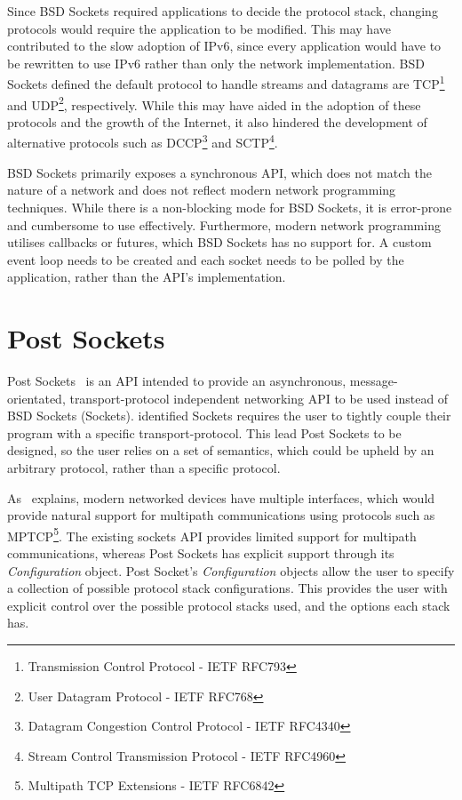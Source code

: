 Since BSD Sockets required applications to decide the protocol stack, changing protocols would require the application
to be modified.
This may have contributed to the slow adoption of IPv6, since every application would have to be rewritten to use IPv6
rather than only the network implementation.
BSD Sockets defined the default protocol to handle streams and datagrams are
TCP\footnote{Transmission Control Protocol - IETF RFC793} and UDP\footnote{User Datagram Protocol - IETF RFC768},
respectively.
While this may have aided in the adoption of these protocols and the growth of the Internet, it also hindered the
development of alternative protocols such as DCCP\footnote{Datagram Congestion Control Protocol - IETF RFC4340} and
SCTP\footnote{Stream Control Transmission Protocol - IETF RFC4960}.

BSD Sockets primarily exposes a synchronous API, which does not match the nature of a network and does not reflect
modern network programming techniques.
While there is a non-blocking mode for BSD Sockets, it is error-prone and cumbersome to use effectively.
Furthermore, modern network programming utilises callbacks or futures, which BSD Sockets has no support for.
A custom event loop needs to be created and each socket needs to be polled by the application, rather than the API's
implementation.

\section{Post Sockets}\label{sec:post-sockets}
Post Sockets~\citep{kuhlewind_postsocketsabstract_} is an API intended to provide an asynchronous, message-orientated,
transport-protocol independent networking API to be used instead of BSD Sockets (Sockets).
\citet{kuhlewind_postsocketsabstract_} identified Sockets requires the user to tightly couple their program with a
specific transport-protocol.
This lead Post Sockets to be designed, so the user relies on a set of semantics, which could be upheld by an arbitrary
protocol, rather than a specific protocol.

As~\cite{kuhlewind_postsocketsabstract_} explains, modern networked devices have multiple interfaces, which would
provide natural support for multipath communications using protocols such as
MPTCP\footnote{Multipath TCP Extensions - IETF RFC6842}.
The existing sockets API provides limited support for multipath communications, whereas Post Sockets has explicit
support through its \emph{Configuration} object.
Post Socket's \emph{Configuration} objects allow the user to specify a collection of possible protocol stack
configurations.
This provides the user with explicit control over the possible protocol stacks used, and the options each stack has.

